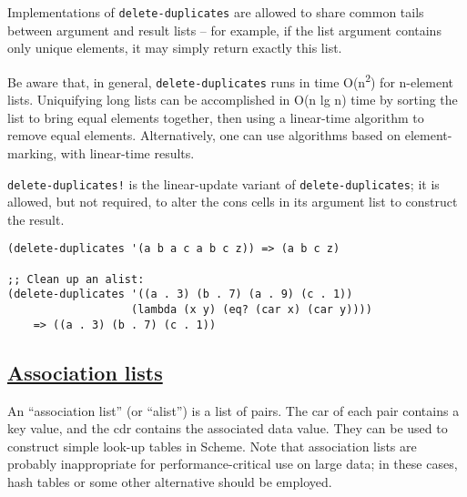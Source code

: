 \begin{description}
Implementations of \texttt{delete-duplicates} are allowed to share
common tails between argument and result lists -- for example, if the
list argument contains only unique elements, it may simply return
exactly this list.

Be aware that, in general, \texttt{delete-duplicates} runs in time
O(n\textsuperscript{2}) for n-element lists. Uniquifying long lists can
be accomplished in O(n lg n) time by sorting the list to bring equal
elements together, then using a linear-time algorithm to remove equal
elements. Alternatively, one can use algorithms based on
element-marking, with linear-time results.

\texttt{delete-duplicates!} is the linear-update variant of
\texttt{delete-duplicates}; it is allowed, but not required, to alter
the cons cells in its argument list to construct the result.

\begin{verbatim}
(delete-duplicates '(a b a c a b c z)) => (a b c z)

;; Clean up an alist:
(delete-duplicates '((a . 3) (b . 7) (a . 9) (c . 1))
                   (lambda (x y) (eq? (car x) (car y))))
    => ((a . 3) (b . 7) (c . 1))
\end{verbatim}
\end{description}

\subsection{\texorpdfstring{\href{}{Association
lists}}{Association lists}}\label{association-lists}

An ``association list'' (or ``alist'') is a list of pairs. The car of
each pair contains a key value, and the cdr contains the associated data
value. They can be used to construct simple look-up tables in Scheme.
Note that association lists are probably inappropriate for
performance-critical use on large data; in these cases, hash tables or
some other alternative should be employed.

